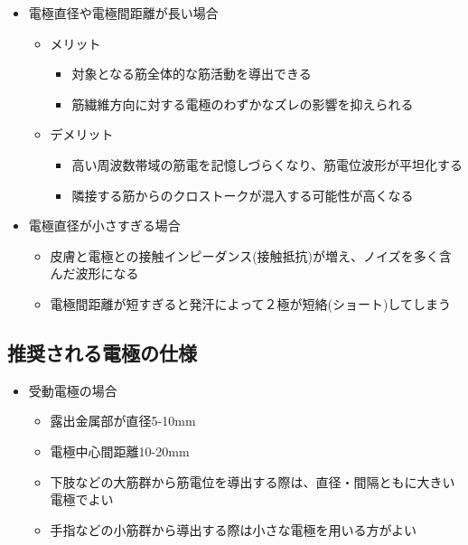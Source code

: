 \documentclass[10pt,twocolumn]{jarticle}
\begin{document}
\begin{itemize}
\item 電極直径や電極間距離が長い場合

	\begin{itemize}
	\item メリット

		\begin{itemize}
		\item 対象となる筋全体的な筋活動を導出できる
		\item 筋繊維方向に対する電極のわずかなズレの影響を抑えられる
		\end{itemize}

	\item デメリット

		\begin{itemize}
		\item 高い周波数帯域の筋電を記憶しづらくなり、筋電位波形が平坦化する
		\item 隣接する筋からのクロストークが混入する可能性が高くなる
		\end{itemize}


	\end{itemize}

\item 電極直径が小さすぎる場合

	\begin{itemize}
	\item 皮膚と電極との接触インピーダンス(接触抵抗)が増え、ノイズを多く含んだ波形になる
	\item 電極間距離が短すぎると発汗によって２極が短絡(ショート)してしまう
	\end{itemize}
\end{itemize}

{\footnotesize
\subsection{推奨される電極の仕様}

\begin{itemize}

\item 受動電極の場合

\begin{itemize}
\item 露出金属部が直径5-10mm
\item 電極中心間距離10-20mm
\item 下肢などの大筋群から筋電位を導出する際は、直径・間隔ともに大きい電極でよい
\item 手指などの小筋群から導出する際は小さな電極を用いる方がよい

\end{itemize}

\end{itemize}
}
\end{document}

